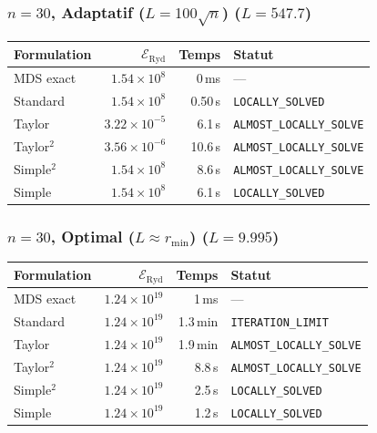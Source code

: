 \subsubsection{$n=30$, Adaptatif ($L{=}100\sqrt{n}$) ($L=547.7$)}
\begin{longtable}{@{}lrrl@{}}
  \toprule
  Formulation & $\mathcal{E}_{\mathrm{Ryd}}$ & Temps & Statut \\
  \midrule
  \endhead
  MDS exact & $1.54\times10^{8}$ & 0\,ms & --- \\
  Standard & $1.54\times10^{8}$ & 0.50\,s & \texttt{LOCALLY\_SOLVED} \\
  Taylor & $3.22\times10^{-5}$ & 6.1\,s & \texttt{ALMOST\_LOCALLY\_SOLVE} \\
  Taylor$^2$ & $3.56\times10^{-6}$ & 10.6\,s & \texttt{ALMOST\_LOCALLY\_SOLVE} \\
  Simple$^2$ & $1.54\times10^{8}$ & 8.6\,s & \texttt{ALMOST\_LOCALLY\_SOLVE} \\
  Simple & $1.54\times10^{8}$ & 6.1\,s & \texttt{LOCALLY\_SOLVED} \\
  \bottomrule
\end{longtable}

\subsubsection{$n=30$, Optimal ($L{\approx}r_{\min}$) ($L=9.995$)}
\begin{longtable}{@{}lrrl@{}}
  \toprule
  Formulation & $\mathcal{E}_{\mathrm{Ryd}}$ & Temps & Statut \\
  \midrule
  \endhead
  MDS exact & $1.24\times10^{19}$ & 1\,ms & --- \\
  Standard & $1.24\times10^{19}$ & 1.3\,min & \texttt{ITERATION\_LIMIT} \\
  Taylor & $1.24\times10^{19}$ & 1.9\,min & \texttt{ALMOST\_LOCALLY\_SOLVE} \\
  Taylor$^2$ & $1.24\times10^{19}$ & 8.8\,s & \texttt{ALMOST\_LOCALLY\_SOLVE} \\
  Simple$^2$ & $1.24\times10^{19}$ & 2.5\,s & \texttt{LOCALLY\_SOLVED} \\
  Simple & $1.24\times10^{19}$ & 1.2\,s & \texttt{LOCALLY\_SOLVED} \\
  \bottomrule
\end{longtable}

